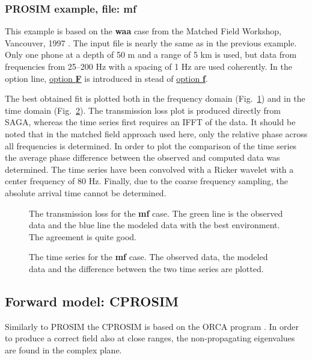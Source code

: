 \documentclass{saclantc}
\begin{document}
\subsubsection{PROSIM example, file: {\bf mf}}
\label{se:mf}
This example is based on the {\bf waa} case from the Matched Field Workshop,
Vancouver, 1997 \cite{chapman,siderius:97}. 
The input file is nearly the same as in the previous example. 
Only one phone at a depth of 50 m and a range of 5 km 
is used, but  data from frequencies from 25--200 Hz
with a spacing of 1 Hz are used coherently. In the option line, 
\underline{option {\bf F}} is introduced in stead of \underline{option {\bf f}}.

The best obtained fit is plotted both in the frequency domain
(Fig.~\ref{fig:mf_freq}) and in the time domain (Fig.~\ref{fig:mf_time}).
The transmission loss plot is produced directly from {\sf SAGA},
whereas the time series first requires an IFFT of the data.
It should be noted that in the matched field approach used here, only
the relative phase across all frequencies is determined.  In order to
plot the comparison of the time series the  average phase difference between
the observed and computed data was
determined. The time series have been convolved with a Ricker
wavelet with a center frequency of 80 Hz. Finally, due to the coarse
frequency sampling, the absolute arrival time cannot be determined.

\begin{figure}
\epsfxsize=10cm
\centerline{}
\caption{The transmission loss for the {\bf mf} case. The green line is
the observed data and the blue line the modeled data with the best
environment.
The agreement is quite good.} 
\label{fig:mf_freq}
\end{figure}
\begin{figure}
\epsfxsize=10cm
\centerline{}
\caption{The time series for the {\bf mf} case. The observed data, the modeled
data and the difference between the two time series are plotted.} 
\label{fig:mf_time}
\end{figure}

\subsection{Forward model: CPROSIM }
Similarly to {\sc PROSIM} the {\sc CPROSIM}  
is based on
the {\sf ORCA} program \cite{levinson:asa95,westwood:asa96}. 
In order to produce a correct field also at close ranges, the
non-propagating eigenvalues are found in the complex plane.
\end{document}
